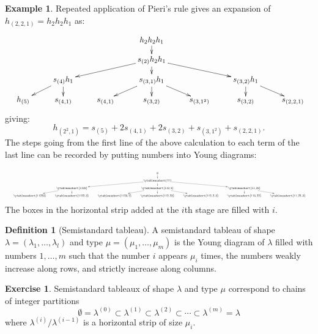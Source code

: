 \documentclass[11pt]{amsart}
\theoremstyle{definition}
\newtheorem{definition}[theorem]{Definition}
\theoremstyle{example}
\newtheorem{example}[theorem]{Example}
\newtheorem{exercise}[theorem]{Exercise}
\begin{document}
\begin{example}
  \label{example:expansion-h}
  Repeated application of Pieri's rule gives an expansion of $h_{(2, 2, 1)} = h_2h_2h_1$ as:
  \begin{displaymath}
    \resizebox{\textwidth}{!}{
      \xymatrix@R-15pt{
        &&&h_2 h_2 h_1\ar[d]&&&\\
        &&&s_{(2)} h_2 h_1\ar[dll]\ar[d]\ar[drr]&&\\
        &s_{(4)}h_1\ar[dl]\ar[d] && s_{(3,1)}h_1\ar[dl]\ar[d]\ar[dr] && s_{(3,2)}h_1 \ar[d]\ar[dr]&\\
        h_{(5)} & s_{(4, 1)} & s_{(4,1)} & s_{(3, 2)} & s_{(3, 1^2)} & s_{(3,2)} & s_{(2,2,1)}
      }
    }
  \end{displaymath}
  giving:
  \begin{displaymath}
    h_{(2^2,1)} = s_{(5)} + 2s_{(4,1)} + 2s_{(3,2)} + s_{(3,1^2)} + s_{(2,2,1)}.
  \end{displaymath}
  The steps going from the first line of the above calculation to each term of the last line can be recorded by putting numbers into Young diagrams:
  \begin{displaymath}
    \resizebox{\textwidth}{!}{
      \xymatrix@R-15pt{
        &&&\emptyset\ar[d]&&&\\
        &&&\ytableaushort{11}\ar[dll]\ar[d]\ar[drr]&&\\
        &\ytableaushort{1122}\ar[dl]\ar[d] && \ytableaushort{112,2}\ar[dl]\ar[d]\ar[dr] && \ytableaushort{11,22}\ar[d]\ar[dr]&\\
        \ytableaushort{11223} & \ytableaushort{1122,3} & \ytableaushort{1123,2} & \ytableaushort{112,23} & \ytableaushort{112,2,3} & \ytableaushort{113,22} & \ytableaushort{11,22,3}
      }
    }
  \end{displaymath}
  The boxes in the horizontal strip added at the $i$th stage are filled with $i$.
\end{example}
\begin{definition}
  [Semistandard tableau]
  A semistandard tableau of shape $\lambda=(\lambda_1,\dotsc,\lambda_l)$ and type $\mu=(\mu_1,\dotsc,\mu_m)$ is the Young diagram of $\lambda$ filled with numbers $1,\dotsc, m$ such that the number $i$ appears $\mu_i$ times, the numbers weakly increase along rows, and strictly increase along columns.
\end{definition}
\begin{exercise}
  Semistandard tableaux of shape $\lambda$ and type $\mu$ correspond to chains of integer partitions
  \begin{displaymath}
    \emptyset = \lambda^{(0)} \subset \lambda^{(1)}\subset \lambda^{(2)} \subset \dotsb \subset \lambda^{(m)} = \lambda
  \end{displaymath}
  where $\lambda^{(i)}/\lambda^{(i-1)}$ is a horizontal strip of size $\mu_i$.
\end{exercise}
\end{document}
